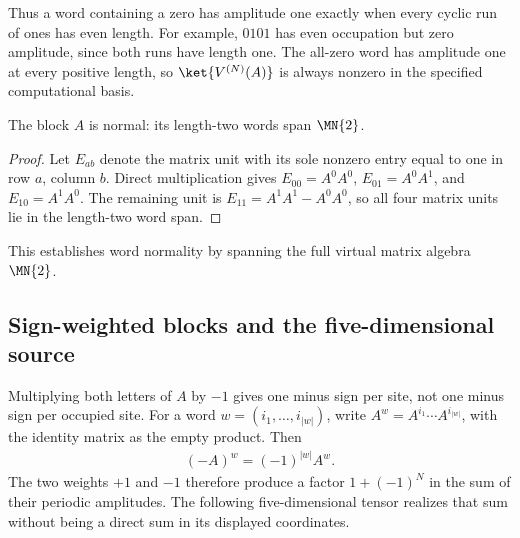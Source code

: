 Thus a word containing a zero has amplitude one exactly when every
cyclic run of ones has even length. For example, $0101$ has even
occupation but zero amplitude, since both runs have length one.
The all-zero word has amplitude one at every positive length, so
$\ket{V^{(N)}(A)}$ is always nonzero in the specified computational basis.

\begin{theorem}
    \label{thm:asymex_parity_normal}
    \leanok
    The block $A$ is normal: its length-two words span $\MN{2}$.
\end{theorem}

\begin{proof}
    \leanok
    Let $E_{ab}$ denote the matrix unit with its sole nonzero entry
    equal to one in row $a$, column $b$. Direct multiplication gives
    $E_{00}=A^0A^0$, $E_{01}=A^0A^1$, and $E_{10}=A^1A^0$.
    The remaining unit is $E_{11}=A^1A^1-A^0A^0$, so all four
    matrix units lie in the length-two word span.
\end{proof}

This establishes word normality by spanning the full virtual matrix algebra
$\MN{2}$.

\subsection{Sign-weighted blocks and the five-dimensional source}

Multiplying both letters of $A$ by $-1$ gives one minus sign per
site, not one minus sign per occupied site. For a word
$w=(i_1,\ldots,i_{|w|})$, write
$A^w=A^{i_1}\cdots A^{i_{|w|}}$, with the identity matrix as the
empty product. Then
\begin{align}
    (-A)^w=(-1)^{|w|}A^w.
    \label{eq:asymex_parity_weight}
\end{align}
The two weights $+1$ and $-1$ therefore produce a factor
$1+(-1)^N$ in the sum of their periodic amplitudes. The following
five-dimensional tensor realizes that sum without being a direct
sum in its displayed coordinates.

